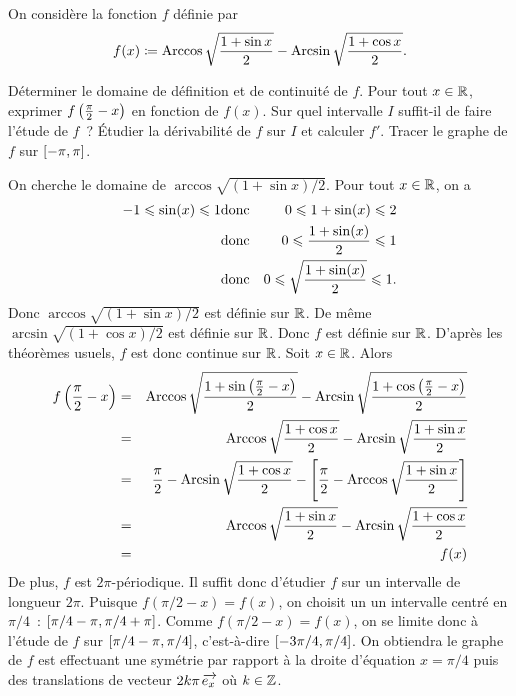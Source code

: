 \documentclass{magnolia}
\begin{document}
On considère la fonction $f$ définie par
$$f(x)\coloneqq\operatorname{Arccos}\sqrt{\frac{1+\sin x}{2}}-\operatorname{Arcsin}\sqrt{\frac{1+\cos x}{2}}.$$
\begin{questions}
\question Déterminer le domaine de définition et de continuité de $f$.
\question Pour tout $x\in\mathbb{R}$, exprimer $f\left(\frac{\pi}{2}-x\right)$ en fonction de
  $f(x)$. Sur quel intervalle $I$ suffit-il de faire l'étude de $f$~?
\question Étudier la dérivabilité de $f$ sur $I$ et calculer $f'$.
\question Tracer le graphe de $f$ sur $\left[-\pi,\pi\right]$.
\end{questions}
\begin{sol}
\begin{questions}
\question On cherche le domaine de $\arccos\sqrt{(1+\sin x)/2}$. Pour tout $x\in\mathbb{R}$, on a
\begin{eqnarray*}
-1\leqslant\sin(x)\leqslant 1
&\text{donc}& 0\leqslant 1+\sin(x)\leqslant 2\\
&\text{donc}& 0\leqslant \frac{1+\sin(x)}{2}\leqslant 1\\
&\text{donc}& 0\leqslant \sqrt{\frac{1+\sin(x)}{2}}\leqslant 1.
\end{eqnarray*}
Donc $\arccos\sqrt{(1+\sin x)/2}$ est définie sur $\mathbb{R}$. De même $\arcsin\sqrt{(1+\cos x)/2}$ est définie sur $\mathbb{R}$. Donc $f$ est définie sur $\mathbb{R}$. D'après les théorèmes usuels, $f$ est donc continue sur $\mathbb{R}$.
\question Soit $x\in\mathbb{R}$. Alors
\begin{eqnarray*}
f\left(\frac{\pi}{2}-x\right)
&=& \operatorname{Arccos}\sqrt{\frac{1+\sin\left(\frac{\pi}{2}-x\right)}{2}}-\operatorname{Arcsin}\sqrt{\frac{1+\cos\left(\frac{\pi}{2}-x\right)}{2}}\\
&=& \operatorname{Arccos}\sqrt{\frac{1+\cos x}{2}}-\operatorname{Arcsin}\sqrt{\frac{1+\sin x}{2}}\\
&=& \frac{\pi}{2}-\operatorname{Arcsin}\sqrt{\frac{1+\cos x}{2}}-\left[\frac{\pi}{2}-\operatorname{Arccos}\sqrt{\frac{1+\sin x}{2}}\right]\\
&=& \operatorname{Arccos}\sqrt{\frac{1+\sin x}{2}} - \operatorname{Arcsin}\sqrt{\frac{1+\cos x}{2}}\\
&=& f(x)
\end{eqnarray*}
De plus, $f$ est $2\pi$-périodique. Il suffit donc d'étudier $f$ sur un intervalle de longueur $2\pi$. Puisque $f(\pi/2-x)=f(x)$, on choisit un un intervalle centré en $\pi/4$~: $\left[\pi/4-\pi,\pi/4+\pi\right]$. Comme $f(\pi/2-x)=f(x)$, on se limite donc à l'étude de $f$ sur $\left[\pi/4-\pi,\pi/4\right]$, c'est-à-dire $\left[-3\pi/4,\pi/4\right]$.
On obtiendra le graphe de $f$ est effectuant une symétrie par rapport à la droite d'équation $x=\pi/4$ puis des translations de vecteur $2k\pi\kern 2pt\overrightarrow{\kern -2pte_x}$ où $k\in\mathbb{Z}$.

\end{questions}
\end{sol}
\end{document}
